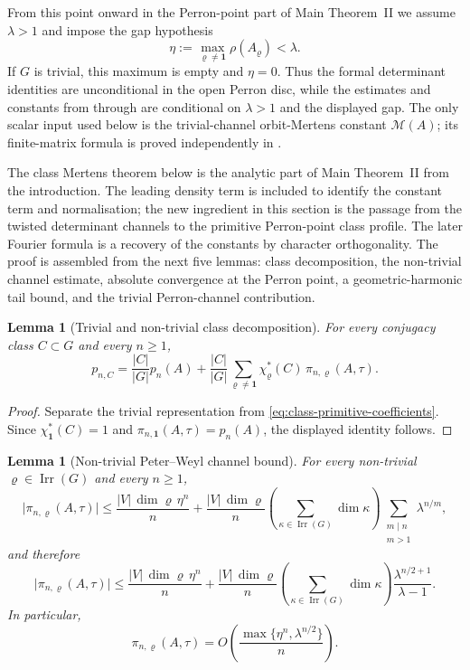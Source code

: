 \documentclass[11pt,a4paper]{amsart}
\theoremstyle{plain}
\newtheorem{lemma}[theorem]{Lemma}
\theoremstyle{definition}
\theoremstyle{remark}
\DeclareMathOperator{\Irr}{Irr}
\newcommand{\abs}[1]{\lvert #1 \rvert}
\begin{document}
From this point onward in the Perron-point part of Main Theorem~II we
assume \(\lambda>1\) and impose the gap hypothesis
\[
  \eta:=\max_{\varrho\neq\mathbf 1}\rho(A_\varrho)<\lambda.
\]
If \(G\) is trivial, this maximum is empty and \(\eta=0\).
Thus the formal determinant identities
are unconditional in the open Perron disc, while the estimates and
constants from  through
 are conditional on \(\lambda>1\) and
the displayed gap.
The only scalar input used below is the trivial-channel
orbit-Mertens constant \(\mathcal M(A)\); its finite-matrix formula is
proved independently in .

The class Mertens theorem below is the analytic part of Main
Theorem~II from the introduction. The leading density term is included
to identify the constant term and normalisation; the new ingredient in
this section is the passage from the twisted determinant channels to the
primitive Perron-point class profile. The later Fourier formula is a
recovery of the constants by character orthogonality. The proof is
assembled from the next five lemmas:
class decomposition, the non-trivial channel estimate, absolute
convergence at the Perron point, a geometric-harmonic tail bound, and
the trivial Perron-channel contribution.

\begin{lemma}[Trivial and non-trivial class decomposition]
  \label{lem:class-primitive-trivial-split}
  For every conjugacy class \(C\subset G\) and every \(n\ge 1\),
  \[
    p_{n,C}
    =
    \frac{|C|}{|G|}p_n(A)
    +\frac{|C|}{|G|}
      \sum_{\varrho\neq\mathbf 1}
        \chi_\varrho^\ast(C)\,\pi_{n,\varrho}(A,\tau).
  \]
\end{lemma}

\begin{proof}
  Separate the trivial representation from
  \eqref{eq:class-primitive-coefficients}. Since
  \(\chi_{\mathbf 1}^\ast(C)=1\) and
  \(\pi_{n,\mathbf 1}(A,\tau)=p_n(A)\), the displayed identity follows.
\end{proof}

\begin{lemma}[Non-trivial Peter--Weyl channel bound]
  \label{lem:nontrivial-peter-weyl-channel-bound}
  For every non-trivial \(\varrho\in\Irr(G)\) and every \(n\ge 1\),
  \[
    \abs{\pi_{n,\varrho}(A,\tau)}
    \le
    \frac{|V|\,\dim\varrho\,\eta^n}{n}
    +\frac{|V|\,\dim\varrho}{n}
      \left(\sum_{\kappa\in\Irr(G)}\dim\kappa\right)
      \sum_{\substack{m\mid n\\ m>1}}\lambda^{n/m},
  \]
  and therefore
  \[
    \abs{\pi_{n,\varrho}(A,\tau)}
    \le
    \frac{|V|\,\dim\varrho\,\eta^n}{n}
    +\frac{|V|\,\dim\varrho}{n}
      \left(\sum_{\kappa\in\Irr(G)}\dim\kappa\right)
      \frac{\lambda^{n/2+1}}{\lambda-1}.
  \]
  In particular,
  \[
    \pi_{n,\varrho}(A,\tau)
    =O\!\left(\frac{\max\{\eta^n,\lambda^{n/2}\}}{n}\right).
  \]
\end{lemma}
\end{document}
